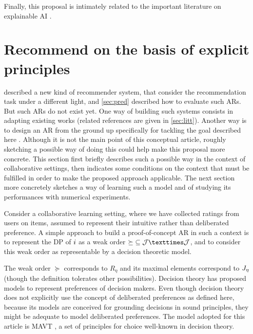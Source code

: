 \documentclass[version=3.21, pagesize, twoside=off, bibliography=totoc, DIV=calc, fontsize=12pt, a4paper, french, english]{scrartcl}
\begin{document}
Finally, this proposal is intimately related to the important literature on explainable AI \citep{DBLP:journals/corr/abs-1804-11192}.

\section{Recommend on the basis of explicit principles}
\label{sec:princ}
 described a new kind of recommender system, that consider the recommendation task under a different light, and \cref{sec:pred} described how to evaluate such \acp{AR}. But such \acp{AR} do not exist yet. One way of building such systems consists in adapting existing works (related references are given in \cref{sec:litt}). Another way is to design an \ac{AR} from the ground up specifically for tackling the goal described here . Although it is not the main point of this conceptual article, roughly sketching a possible way of doing this could help make this proposal more concrete. This section first briefly describes such a possible way in the context of collaborative settings, then indicates some conditions on the context that must be fulfilled in order to make the proposed approach applicable. The next section more concretely sketches a way of learning such a model and of studying its performances with numerical experiments.

Consider a collaborative learning setting, where we have collected ratings from users on items, assumed to represent their intuitive rather than deliberated preference. 
A simple approach to build a proof-of-concept \ac{AR} in such a context is to represent the \ac{DP} of $i$ as a weak order ${\succeq} \subseteq \allitems × \allitems$, and to consider this weak order as representable by a decision theoretic model.

The weak order ${\succeq}$ corresponds to $R_\eta$ and its maximal elements correspond to $J_{\eta}$ (though the definition tolerates other possibilities). Decision theory has proposed models to represent preferences of decision makers. Even though decision theory does not explicitly use the concept of deliberated preferences as defined here, because its models are conceived for grounding decisions in sound principles, they might be adequate to model deliberated preferences. 
The model adopted for this article is \ac{MAVT} \citep{keeney_decisions_1993}, a set of principles for choice well-known in decision theory.
\end{document}
